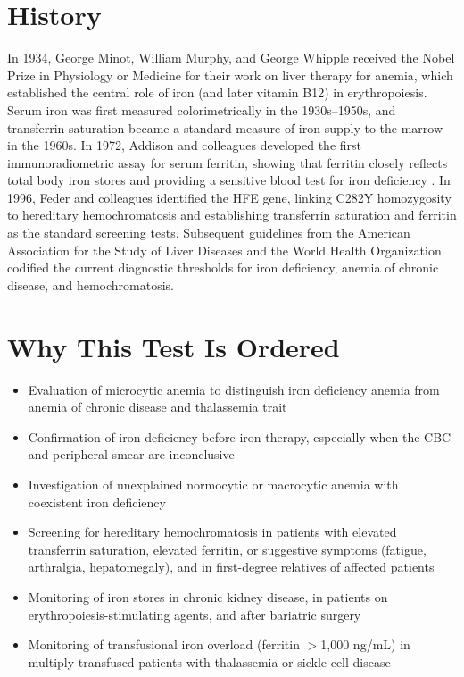 \section*{History}
In 1934, George Minot, William Murphy, and George Whipple received the Nobel Prize in Physiology or Medicine for their work on liver therapy for anemia, which established the central role of iron (and later vitamin B12) in erythropoiesis. Serum iron was first measured colorimetrically in the 1930s--1950s, and transferrin saturation became a standard measure of iron supply to the marrow in the 1960s. In 1972, Addison and colleagues developed the first immunoradiometric assay for serum ferritin, showing that ferritin closely reflects total body iron stores and providing a sensitive blood test for iron deficiency \cite{addison1972immunoradiometric}. In 1996, Feder and colleagues identified the HFE gene, linking C282Y homozygosity to hereditary hemochromatosis and establishing transferrin saturation and ferritin as the standard screening tests. Subsequent guidelines from the American Association for the Study of Liver Diseases and the World Health Organization codified the current diagnostic thresholds for iron deficiency, anemia of chronic disease, and hemochromatosis.
\section*{Why This Test Is Ordered}
\begin{itemize}
  \item Evaluation of microcytic anemia to distinguish iron deficiency anemia from anemia of chronic disease and thalassemia trait
  \item Confirmation of iron deficiency before iron therapy, especially when the CBC and peripheral smear are inconclusive
  \item Investigation of unexplained normocytic or macrocytic anemia with coexistent iron deficiency
  \item Screening for hereditary hemochromatosis in patients with elevated transferrin saturation, elevated ferritin, or suggestive symptoms (fatigue, arthralgia, hepatomegaly), and in first-degree relatives of affected patients \cite{bacon2011diagnosis}
  \item Monitoring of iron stores in chronic kidney disease, in patients on erythropoiesis-stimulating agents, and after bariatric surgery
  \item Monitoring of transfusional iron overload (ferritin $>$1,000 ng/mL) in multiply transfused patients with thalassemia or sickle cell disease
\end{itemize}
